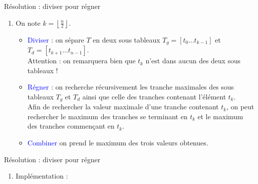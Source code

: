 \documentclass[10pt]{beamer}
\begin{document}
\begin{frame}[fragile]{\Ctitle}{\stitle}
	\begin{exampleblock}{Résolution : diviser pour régner}
		\begin{enumerate}
			\item<1-> On note $k = \left\lfloor \frac{n}{2} \right\rfloor$.
				\begin{itemize}
					\item<2-> \textcolor{blue}{Diviser} : on sépare $T$ en deux sous tableaux $T_g = [t_0 \dots t_{k-1}]$ et $T_d = [t_{k+1}\dots t_{n-1}]$. \\
						\textcolor{BrickRed}{\small \danger} Attention : on remarquera bien que $t_k$ n'est dans aucun des deux sous tableaux !
					\item<3-> \textcolor{blue}{Régner} : on recherche récursivement les tranche maximales des sous tableaux $T_g$ et $T_d$ ainsi que celle des tranches contenant l'élément $t_k$.\\
					Afin de rechercher la valeur maximale d'une tranche contenant $t_k$, on peut rechercher le maximum des tranches se terminant en $t_k$ et le maximum des tranches commençant en $t_k$.
					\item<4-> \textcolor{blue}{Combiner} on prend le maximum des trois valeurs obtenues.
				\end{itemize}
		\end{enumerate}
	\end{exampleblock}
\end{frame}

\begin{frame}[fragile]{\Ctitle}{\stitle}
	\begin{exampleblock}{Résolution : diviser pour régner}
		\begin{enumerate}
			\addtocounter{enumi}{1}
			\item<2-> Implémentation :
		\end{enumerate}
	\end{exampleblock}
\end{frame}
\end{document}
